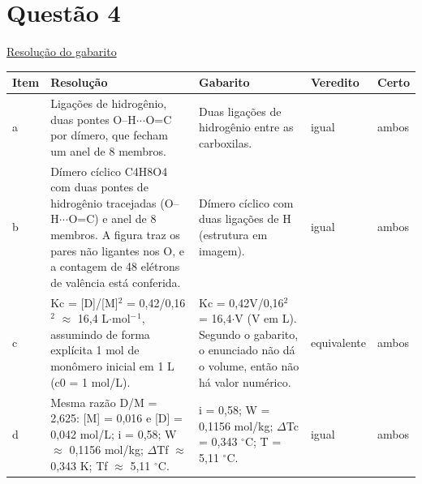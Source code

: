 \documentclass{article}%
\begin{document}
\section*{Questão 4}%
\href{https://poliedroresolve.sistemapoliedro.com.br/vestibulares/ime/2027/ime-2-fase-dia-3-28-10-2026-2-fase-dia-3/dissertativa-4-quimica-2-fase-dia-3-ime-2027}{Resolução do gabarito}\par\smallskip%
\begin{longtable}{@{}p{} p{} p{} p{} p{}@{}}\toprule Item & Resolução & Gabarito & Veredito & Certo \\ \midrule
a & Ligações de hidrogênio, duas pontes O--H$\cdot$$\cdot$$\cdot$O=C por dímero, que fecham um anel de 8 membros. & Duas ligações de hidrogênio entre as carboxilas. & igual & ambos \\
b & Dímero cíclico C4H8O4 com duas pontes de hidrogênio tracejadas (O--H$\cdot$$\cdot$$\cdot$O=C) e anel de 8 membros. A figura traz os pares não ligantes nos O, e a contagem de 48 elétrons de valência está conferida. & Dímero cíclico com duas ligações de H (estrutura em imagem). & igual & ambos \\
c & Kc = {[}D{]}/{[}M{]}$^2$ = 0,42/0,16$^2$ $\approx$ 16,4 L$\cdot$mol$^{-}$$^{1}$, assumindo de forma explícita 1 mol de monômero inicial em 1 L (c0 = 1 mol/L). & Kc = 0,42V/0,16$^2$ = 16,4$\cdot$V (V em L). Segundo o gabarito, o enunciado não dá o volume, então não há valor numérico. & equivalente & ambos \\
d & Mesma razão D/M = 2,625: {[}M{]} = 0,016 e {[}D{]} = 0,042 mol/L; i = 0,58; W $\approx$ 0,1156 mol/kg; $\Delta$Tf $\approx$ 0,343 K; Tf $\approx$ 5,11 $^\circ$C. & i = 0,58; W = 0,1156 mol/kg; $\Delta$Tc = 0,343 $^\circ$C; T = 5,11 $^\circ$C. & igual & ambos \\
\bottomrule\end{longtable}%
\end{document}
